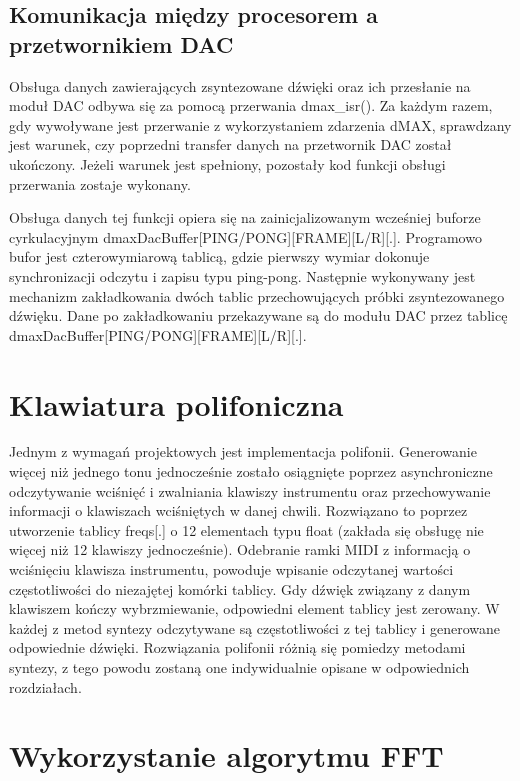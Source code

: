\subsection{Komunikacja między procesorem a przetwornikiem DAC}
Obsługa danych zawierających zsyntezowane dźwięki oraz ich przesłanie na moduł DAC odbywa się za pomocą przerwania dmax\_isr(). Za każdym razem, gdy wywoływane jest przerwanie z wykorzystaniem zdarzenia dMAX, sprawdzany jest warunek, czy poprzedni transfer danych na przetwornik DAC został ukończony. Jeżeli warunek jest spełniony, pozostały kod funkcji obsługi przerwania zostaje wykonany.

Obsługa danych tej funkcji opiera się na zainicjalizowanym wcześniej buforze cyrkulacyjnym dmaxDacBuffer[PING/PONG][FRAME][L/R][.]. Programowo bufor jest czterowymiarową tablicą, gdzie pierwszy wymiar dokonuje synchronizacji odczytu i zapisu typu ping-pong. Następnie wykonywany jest mechanizm zakładkowania dwóch tablic przechowujących próbki zsyntezowanego dźwięku. Dane po zakładkowaniu przekazywane są do modułu DAC przez tablicę dmaxDacBuffer[PING/PONG][FRAME][L/R][.].

\section{Klawiatura polifoniczna}\label{section:real_polifonia}
Jednym z wymagań projektowych jest implementacja polifonii. Generowanie więcej niż jednego tonu jednocześnie zostało osiągnięte poprzez asynchroniczne odczytywanie wciśnięć i zwalniania klawiszy instrumentu oraz przechowywanie informacji o klawiszach wciśniętych w danej chwili. Rozwiązano to poprzez utworzenie tablicy freqs[.] o 12 elementach typu float (zakłada się obsługę nie więcej niż 12 klawiszy jednocześnie). Odebranie ramki MIDI z informacją o wciśnięciu klawisza instrumentu, powoduje wpisanie odczytanej wartości częstotliwości do niezajętej komórki tablicy. Gdy dźwięk związany z danym klawiszem kończy wybrzmiewanie, odpowiedni element tablicy jest zerowany. W każdej z metod syntezy odczytywane są częstotliwości z tej tablicy i generowane odpowiednie dźwięki. Rozwiązania polifonii różnią się pomiedzy metodami syntezy, z tego powodu zostaną one indywidualnie opisane w odpowiednich rozdziałach.



\section{Wykorzystanie algorytmu FFT}

